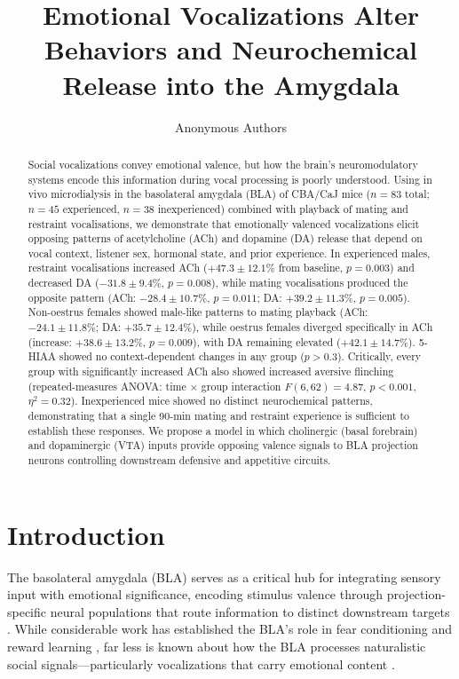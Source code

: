 \documentclass[11pt]{article}
\title{Emotional Vocalizations Alter Behaviors and Neurochemical Release into the Amygdala}
\author{Anonymous Authors}
\date{}
\begin{document}
\maketitle

\begin{abstract}
Social vocalizations convey emotional valence, but how the brain's neuromodulatory systems encode this information during vocal processing is poorly understood. Using in vivo microdialysis in the basolateral amygdala (BLA) of CBA/CaJ mice ($n = 83$ total; $n = 45$ experienced, $n = 38$ inexperienced) combined with playback of mating and restraint vocalisations, we demonstrate that emotionally valenced vocalizations elicit opposing patterns of acetylcholine (ACh) and dopamine (DA) release that depend on vocal context, listener sex, hormonal state, and prior experience. In experienced males, restraint vocalisations increased ACh ($+47.3 \pm 12.1\%$ from baseline, $p = 0.003$) and decreased DA ($-31.8 \pm 9.4\%$, $p = 0.008$), while mating vocalisations produced the opposite pattern (ACh: $-28.4 \pm 10.7\%$, $p = 0.011$; DA: $+39.2 \pm 11.3\%$, $p = 0.005$). Non-oestrus females showed male-like patterns to mating playback (ACh: $-24.1 \pm 11.8\%$; DA: $+35.7 \pm 12.4\%$), while oestrus females diverged specifically in ACh (increase: $+38.6 \pm 13.2\%$, $p = 0.009$), with DA remaining elevated ($+42.1 \pm 14.7\%$). 5-HIAA showed no context-dependent changes in any group ($p > 0.3$). Critically, every group with significantly increased ACh also showed increased aversive flinching (repeated-measures ANOVA: time $\times$ group interaction $F(6,62) = 4.87$, $p < 0.001$, $\eta^2 = 0.32$). Inexperienced mice showed no distinct neurochemical patterns, demonstrating that a single 90-min mating and restraint experience is sufficient to establish these responses. We propose a model in which cholinergic (basal forebrain) and dopaminergic (VTA) inputs provide opposing valence signals to BLA projection neurons controlling downstream defensive and appetitive circuits.
\end{abstract}

\section{Introduction}

The basolateral amygdala (BLA) serves as a critical hub for integrating sensory input with emotional significance, encoding stimulus valence through projection-specific neural populations that route information to distinct downstream targets \citep{janak2015amygdala, ledoux2000emotion, beyeler2018organization}. While considerable work has established the BLA's role in fear conditioning and reward learning \citep{pare2004new, tye2011amygdala, namburi2015circuit}, far less is known about how the BLA processes naturalistic social signals---particularly vocalizations that carry emotional content \citep{brudzynski2013ethotransmission}.
\end{document}
